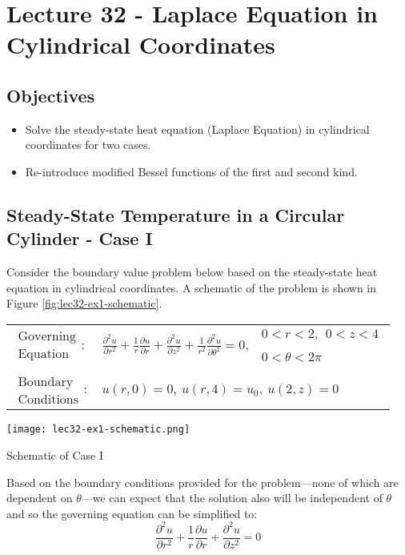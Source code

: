 \chapter{Lecture 32 - Laplace Equation in Cylindrical Coordinates}
\label{ch:lec32}
\section{Objectives}
\begin{itemize}
\item Solve the steady-state heat equation (Laplace Equation) in cylindrical coordinates for two cases.
\item Re-introduce modified Bessel functions of the first and second kind.
\end{itemize}
\setcounter{lstannotation}{0}

\section{Steady-State Temperature in a Circular Cylinder - Case I}
Consider the boundary value problem below based on the steady-state heat equation in cylindrical coordinates. A schematic of the problem is shown in Figure \ref{fig:lec32-ex1-schematic}.
\begin{table}[h]
\begin{tabular}{l l}
$\substack{\text{Governing} \\\text{Equation}}: $& $\frac{\partial^2 u}{\partial r^2} + \frac{1}{r}\frac{\partial u}{\partial r} + \frac{\partial^2 u}{\partial z^2} + \frac{1}{r^2}\frac{\partial^2 u}{\partial \theta^2}= 0, \ \ \substack{0<r<2, \ \ 0<z<4 \\ \\ 0<\theta<2 \pi}$\\
& \\
$\substack{\text{Boundary} \\ \text{Conditions}}: $ & $u(r,0) = 0, \ u(r,4) = u_0, \ u(2,z) = 0$  \\ 
\end{tabular}
\end{table} 
\begin{marginfigure}
\texttt{[image: lec32-ex1-schematic.png]}
\caption{Schematic of Case I}
\label{fig:lec32-ex1-schematic}
\end{marginfigure}

\vspace{0.25cm}

\noindent Based on the boundary conditions provided for the problem---none of which are dependent on $\theta$---we can expect that the solution also will be independent of $\theta$ and so the governing equation can be simplified to:
\begin{equation*}
\frac{\partial^2 u}{\partial r^2} + \frac{1}{r}\frac{\partial u}{\partial r} + \frac{\partial^2 u}{\partial z^2} = 0
\end{equation*}

